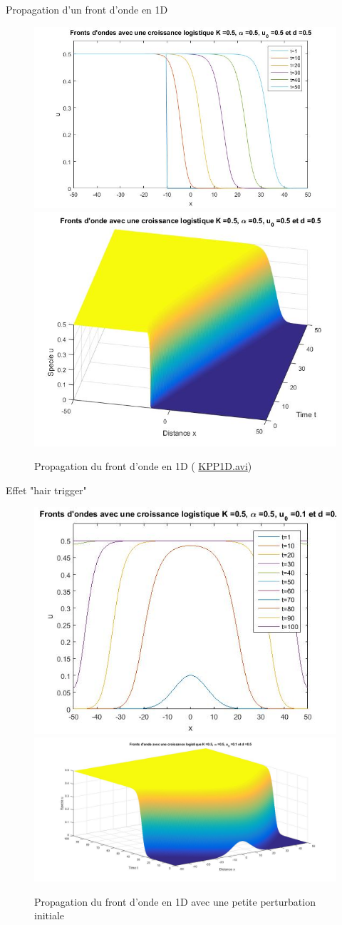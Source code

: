 \documentclass[10pt]{beamer}
\begin{document}
\begin{frame}{Propagation d'un front d'onde en 1D}{}
	\begin{figure}[H]
		\centering
		\includegraphics[width=0.55\linewidth]{SimulationKPP/figures1/FrontOnde2}\hfill
		\includegraphics[width=0.40\linewidth]{SimulationKPP/figures1/FrontOnde1}\hfill
		\caption{Propagation du front d'onde en 1D ( \url{KPP1D.avi})}
	\end{figure}
\end{frame}



\begin{frame}{Effet "hair trigger"}{}
\begin{figure}[H]
	\centering
	\includegraphics[width=0.45\linewidth]{SimulationKPP/TrigerEffect/fronts}\hfill
	\includegraphics[width=0.55\linewidth]{SimulationKPP/TrigerEffect/Surf}\hfill
	\caption{Propagation du front d'onde en 1D avec une petite perturbation initiale}
\end{figure}
\end{frame}
\end{document}
